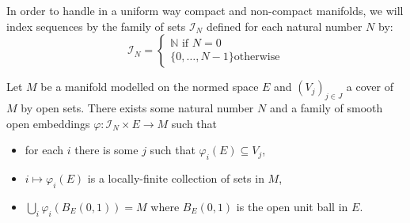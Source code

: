 \documentclass[10pt,a4paper]{article}
\newcommand{\IT}[1]{\mathcal{I}_{#1}}
\newcommand{\uses}[1]{}
\newcommand{\lean}[1]{}
\newcommand{\leanok}{}
\begin{document}
In order to handle in a uniform way compact and non-compact manifolds, we will
index sequences by the family of sets $\IT{N}$ defined for each natural number
$N$ by:
  \[
    \IT{N} =
    \begin{cases}
      ℕ \text{ if $N = 0$}\\
      \{0, \dots, N - 1\} \text{otherwise}
    \end{cases}
  \]

\begin{lemma}
  \label{lem:nice_atlas}
  \lean{nice_atlas}
  \uses{def:index_type}
  \leanok
  Let $M$ be a manifold modelled on the normed space $E$ and $(V_j)_{j ∈ J}$
  a cover of $M$ by open sets. There exists some natural number $N$ and
  a family of smooth open embeddings $φ : \IT{N} × E → M$ such that
  \begin{itemize}
    \item for each $i$ there is some $j$ such that $φ_i(E) \subseteq V_j$,
    \item $i ↦ φ_i(E)$ is a locally-finite collection of sets in $M$,
    \item $⋃_i φ_i(B_E(0, 1)) = M$ where $B_E(0, 1)$ is the open unit ball in $E$.
  \end{itemize}
\end{lemma}
\end{document}
